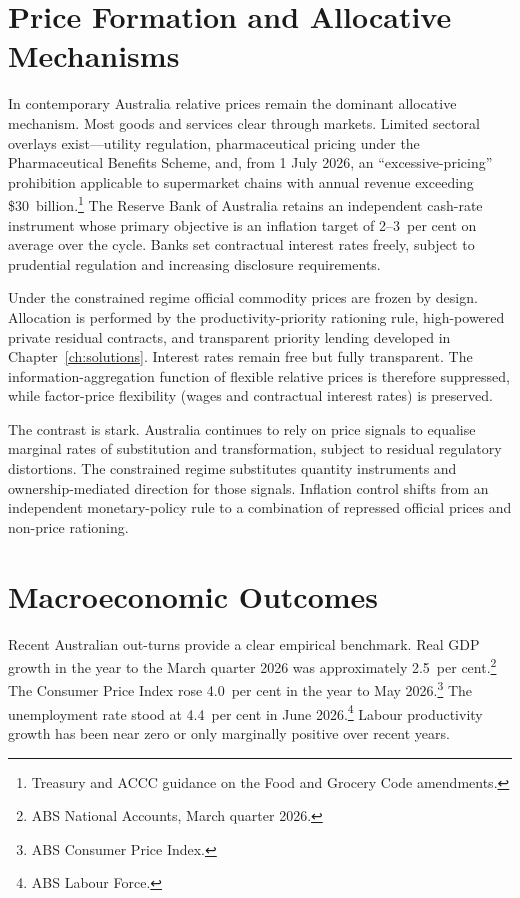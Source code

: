 \documentclass[12pt,anyside]{book}
\theoremstyle{definition}
\theoremstyle{plain}
\theoremstyle{remark}
\begin{document}
\section{Price Formation and Allocative Mechanisms}

In contemporary Australia relative prices remain the dominant allocative mechanism. Most goods and services clear through markets. Limited sectoral overlays exist—utility regulation, pharmaceutical pricing under the Pharmaceutical Benefits Scheme, and, from 1 July 2026, an “excessive-pricing” prohibition applicable to supermarket chains with annual revenue exceeding \$30~billion.\footnote{Treasury and ACCC guidance on the Food and Grocery Code amendments.} The Reserve Bank of Australia retains an independent cash-rate instrument whose primary objective is an inflation target of 2–3~per cent on average over the cycle. Banks set contractual interest rates freely, subject to prudential regulation and increasing disclosure requirements.

Under the constrained regime official commodity prices are frozen by design. Allocation is performed by the productivity-priority rationing rule, high-powered private residual contracts, and transparent priority lending developed in Chapter~\ref{ch:solutions}. Interest rates remain free but fully transparent. The information-aggregation function of flexible relative prices is therefore suppressed, while factor-price flexibility (wages and contractual interest rates) is preserved.

The contrast is stark. Australia continues to rely on price signals to equalise marginal rates of substitution and transformation, subject to residual regulatory distortions. The constrained regime substitutes quantity instruments and ownership-mediated direction for those signals. Inflation control shifts from an independent monetary-policy rule to a combination of repressed official prices and non-price rationing.

\section{Macroeconomic Outcomes}

Recent Australian out-turns provide a clear empirical benchmark. Real GDP growth in the year to the March quarter 2026 was approximately 2.5~per cent.\footnote{ABS National Accounts, March quarter 2026.} The Consumer Price Index rose 4.0~per cent in the year to May 2026.\footnote{ABS Consumer Price Index.} The unemployment rate stood at 4.4~per cent in June 2026.\footnote{ABS Labour Force.} Labour productivity growth has been near zero or only marginally positive over recent years.
\end{document}
